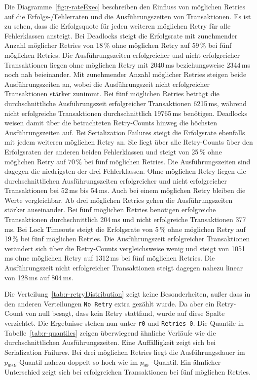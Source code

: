 
Die Diagramme~\ref{fig:r-rateExec} beschreiben den Einfluss von möglichen Retries auf die Erfolgs-/Fehlerraten und
die Ausführungszeiten von Transaktionen.
Es ist zu sehen, dass die Erfolgsquote für jeden weiteren möglichen Retry für alle Fehlerklassen ansteigt.
Bei Deadlocks steigt die Erfolgsrate mit zunehmender Anzahl möglicher Retries von 18\,\% ohne möglichen Retry auf 59\,\%
bei fünf möglichen Retries.
Die Ausführungszeiten erfolgreicher und nicht erfolgreicher Transaktionen liegen ohne möglichen Retry mit 2040\,ms
beziehungsweise 2344\,ms noch nah beieinander.
Mit zunehmender Anzahl möglicher Retries steigen beide Ausführungszeiten an, wobei die Ausführungszeit nicht
erfolgreicher Transaktionen stärker zunimmt.
Bei fünf möglichen Retries beträgt die durchschnittliche Ausführungszeit erfolgreicher Transaktionen 6215\,ms,
während nicht erfolgreiche Transaktionen durchschnittlich 19765\,ms benötigen.
Deadlocks weisen damit über die betrachteten Retry-Counts hinweg die höchsten Ausführungszeiten auf.
Bei Serialization Failures steigt die Erfolgsrate ebenfalls mit jedem weiteren möglichen Retry an.
Sie liegt über alle Retry-Counts über den Erfolgsraten der anderen beiden Fehlerklassen und steigt von 25\,\% ohne
möglichen Retry auf 70\,\% bei fünf möglichen Retries.
Die Ausführungszeiten sind dagegen die niedrigsten der drei Fehlerklassen.
Ohne möglichen Retry liegen die durchschnittlichen Ausführungszeiten erfolgreicher und nicht erfolgreicher
Transaktionen bei 52\,ms bis 54\,ms.
Auch bei einem möglichen Retry bleiben die Werte vergleichbar.
Ab drei möglichen Retries gehen die Ausführungszeiten stärker auseinander.
Bei fünf möglichen Retries benötigen erfolgreiche Transaktionen durchschnittlich 204\,ms und nicht erfolgreiche
Transaktionen 377\,ms.
Bei Lock Timeouts steigt die Erfolgsrate von 5\,\% ohne möglichen Retry auf 19\,\% bei fünf möglichen Retries.
Die Ausführungszeit erfolgreicher Transaktionen verändert sich über die Retry-Counts vergleichsweise wenig und
steigt von 1051\,ms ohne möglichen Retry auf 1312\,ms bei fünf möglichen Retries.
Die Ausführungszeit nicht erfolgreicher Transaktionen steigt dagegen nahezu linear von 128\,ms auf 804\,ms.



Die Verteilung~\ref{tab:r-retryDistribution} zeigt keine Besonderheiten, außer dass in den anderen Verteilungen
\texttt{No Retry} extra gezählt wurde.
Da aber ein Retry-Count von null besagt, dass kein Retry stattfand, wurde auf diese Spalte verzichtet.
Die Ergebnisse stehen nun unter \texttt{r0} und \texttt{Retries 0}.
Die Quantile in Tabelle~\ref{tab:r-quantiles} zeigen überwiegend ähnliche Verläufe wie die durchschnittlichen
Ausführungszeiten.
Eine Auffälligkeit zeigt sich bei Serialization Failures.
Bei drei möglichen Retries liegt die Ausführungsdauer im $p_{99.9}$-Quantil nahezu doppelt so hoch wie im $p_{99}$
-Quantil.
Ein ähnlicher Unterschied zeigt sich bei erfolgreichen Transaktionen bei fünf möglichen Retries.

